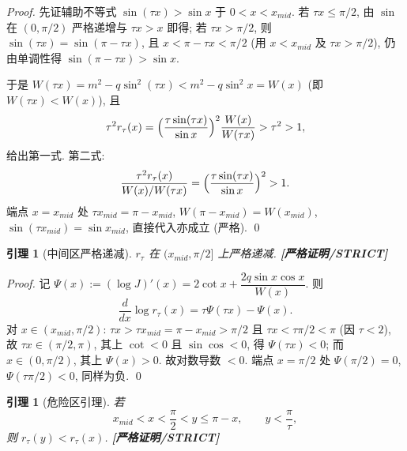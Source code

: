 \documentclass[UTF8]{ctexart}
\newtheorem{lemma}[theorem]{引理}
\newcommand{\STRICT}{\textbf{[严格证明/STRICT]}}
\begin{document}
\begin{proof}
	先证辅助不等式 $\sin(\tau x)>\sin x$ 于 $0<x<x_{mid}$. 若 $\tau x\le\pi/2$,
	由 $\sin$ 在 $(0,\pi/2)$ 严格递增与 $\tau x>x$ 即得; 若 $\tau x>\pi/2$, 则
	$\sin(\tau x)=\sin(\pi-\tau x)$, 且 $x<\pi-\tau x<\pi/2$ (用 $x<x_{mid}$ 及 $\tau x>\pi/2$),
	仍由单调性得 $\sin(\pi-\tau x)>\sin x$.

	于是 $W(\tau x)=m^2-q\sin^2(\tau x)<m^2-q\sin^2x=W(x)$ (即
	$W(\tau x)<W(x)$), 且
	\begin{equation}
		\tau^2r_\tau(x)=\Bigl(\frac{\tau\sin(\tau x)}{\sin x}\Bigr)^2
		\frac{W(x)}{W(\tau x)}>\tau^2>1,
	\end{equation}
	给出第一式. 第二式:
	\begin{equation}
		\frac{\tau^2r_\tau(x)}{W(x)/W(\tau x)}
		=\Bigl(\frac{\tau\sin(\tau x)}{\sin x}\Bigr)^2>1.
	\end{equation}
	端点 $x=x_{mid}$ 处 $\tau x_{mid}=\pi-x_{mid}$, $W(\pi-x_{mid})=W(x_{mid})$,
	$\sin(\tau x_{mid})=\sin x_{mid}$, 直接代入亦成立 (严格). \qed
\end{proof}

\begin{lemma}[中间区严格递减]\label{lem:decr}
	$r_\tau$ 在 $(x_{mid},\pi/2]$ 上严格递减. \STRICT{}
\end{lemma}

\begin{proof}
	记 $\Psi(x):=(\log J)'(x)=2\cot x+\dfrac{2q\sin x\cos x}{W(x)}$. 则
	\begin{equation}
		\frac{d}{dx}\log r_\tau(x)=\tau\Psi(\tau x)-\Psi(x).
	\end{equation}
	对 $x\in(x_{mid},\pi/2)$: $\tau x>\tau x_{mid}=\pi-x_{mid}>\pi/2$ 且
	$\tau x<\tau\pi/2<\pi$ (因 $\tau<2$), 故 $\tau x\in(\pi/2,\pi)$, 其上
	$\cot<0$ 且 $\sin\cos<0$, 得 $\Psi(\tau x)<0$; 而 $x\in(0,\pi/2)$, 其上
	$\Psi(x)>0$. 故对数导数 $<0$. 端点 $x=\pi/2$ 处
	$\Psi(\pi/2)=0$, $\Psi(\tau\pi/2)<0$, 同样为负. \qed
\end{proof}

\begin{lemma}[危险区引理]\label{lem:danger}
	若
	\begin{equation}
		x_{mid}<x<\frac\pi2<y\le\pi-x,\qquad y<\frac\pi\tau,
	\end{equation}
	则 $r_\tau(y)<r_\tau(x)$. \STRICT{}
\end{lemma}
\end{document}
